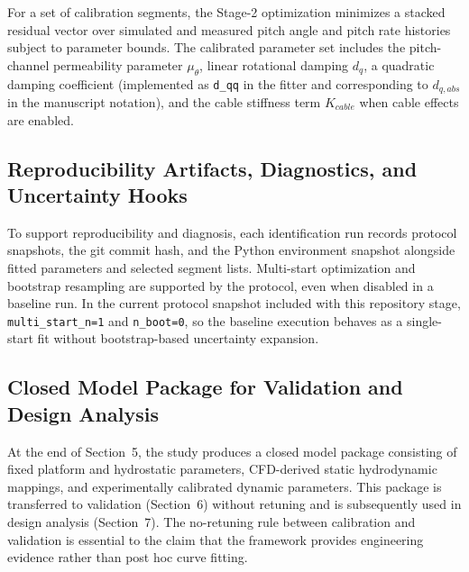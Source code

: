 For a set of calibration segments, the Stage-2 optimization minimizes a stacked residual vector over simulated and measured pitch angle and pitch rate histories subject to parameter bounds. The calibrated parameter set includes the pitch-channel permeability parameter $\mu_{\theta}$, linear rotational damping $d_q$, a quadratic damping coefficient (implemented as \texttt{d\_qq} in the fitter and corresponding to $d_{q,abs}$ in the manuscript notation), and the cable stiffness term $K_{cable}$ when cable effects are enabled.

\subsection{Reproducibility Artifacts, Diagnostics, and Uncertainty Hooks}

To support reproducibility and diagnosis, each identification run records protocol snapshots, the git commit hash, and the Python environment snapshot alongside fitted parameters and selected segment lists. Multi-start optimization and bootstrap resampling are supported by the protocol, even when disabled in a baseline run. In the current protocol snapshot included with this repository stage, \texttt{multi\_start\_n=1} and \texttt{n\_boot=0}, so the baseline execution behaves as a single-start fit without bootstrap-based uncertainty expansion.


\subsection{Closed Model Package for Validation and Design Analysis}

At the end of Section~5, the study produces a closed model package consisting of fixed platform and hydrostatic parameters, CFD-derived static hydrodynamic mappings, and experimentally calibrated dynamic parameters. This package is transferred to validation (Section~6) without retuning and is subsequently used in design analysis (Section~7). The no-retuning rule between calibration and validation is essential to the claim that the framework provides engineering evidence rather than post hoc curve fitting.

